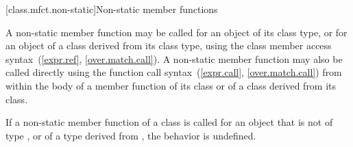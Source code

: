 [class.mfct.non-static]{Non-static member functions}%

\pnum
A non-static member function may be called for an object of
its class type, or for an object of a class derived
from its class type, using the class member
access syntax~(\ref{expr.ref}, \ref{over.match.call}). A non-static
member function may also be called directly using the function call
syntax~(\ref{expr.call}, \ref{over.match.call}) from within
the body of a member function of its class or of a class derived from
its class.

\pnum
{}%
If a non-static member function of a class  is called for an
object that is not of type , or of a type derived from
, the behavior is undefined.

